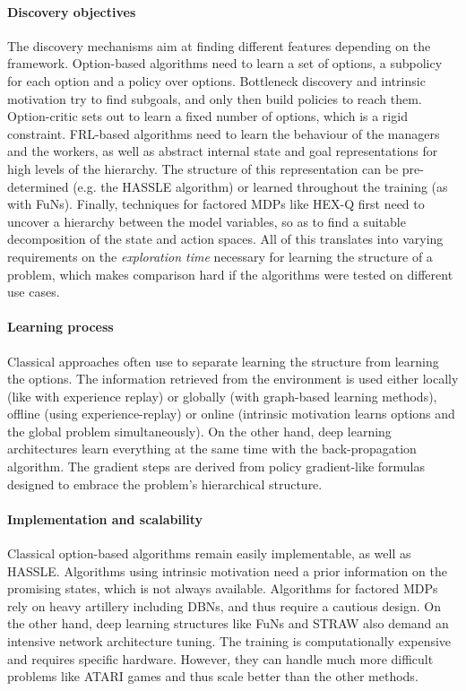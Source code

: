 \documentclass{article}
\begin{document}
\paragraph{Discovery objectives}
The discovery mechanisms aim at finding different features depending on the framework. Option-based algorithms need to learn a set of options, a subpolicy for each option and a policy over options. Bottleneck discovery and intrinsic motivation try to find subgoals, and only then build policies to reach them. Option-critic sets out to learn a fixed number of options, which is a rigid constraint. FRL-based algorithms need to learn the behaviour of the managers and the workers, as well as abstract internal state and goal representations for high levels of the hierarchy. The structure of this representation can be pre-determined (e.g. the HASSLE algorithm) or learned throughout the training (as with FuNs). Finally, techniques for factored MDPs like HEX-Q first need to uncover a hierarchy between the model variables, so as to find a suitable decomposition of the state and action spaces. All of this translates into varying requirements on the \textit{exploration time} necessary for learning the structure of a problem, which makes comparison hard if the algorithms were tested on different use cases.

\paragraph{Learning process} Classical approaches often use to separate learning the structure from learning the options. The information retrieved from the environment is used either locally (like with experience replay) or globally (with graph-based learning methods), offline (using experience-replay) or online (intrinsic motivation learns options and the global problem simultaneously). On the other hand, deep learning architectures learn everything at the same time with the back-propagation algorithm. The gradient steps are derived from policy gradient-like formulas designed to embrace the problem's hierarchical structure.

\paragraph{Implementation and scalability} Classical option-based algorithms remain easily implementable, as well as HASSLE. Algorithms using intrinsic motivation need a prior information on the promising states, which is not always available. Algorithms for factored MDPs rely on heavy artillery including DBNs, and thus require a cautious design. On the other hand, deep learning structures like FuNs and STRAW also demand an intensive network architecture tuning. The training is computationally expensive and requires specific hardware. However, they can handle much more difficult problems like ATARI games and thus scale better than the other methods.
\end{document}
